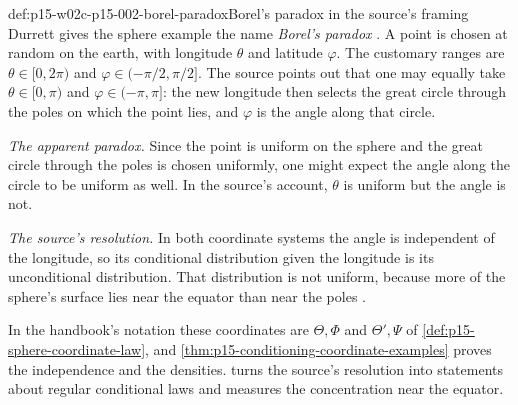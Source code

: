 \begin{hbexample}{def:p15-w02c-p15-002-borel-paradox}{Borel's paradox in the source's framing}
Durrett gives the sphere example the name \emph{Borel's paradox}
\cite[Example~4.1.8, p.~210]{DurrettPTEAuthor2019}. A point is chosen at
random on the earth, with longitude \(\theta\) and latitude \(\varphi\).
The customary ranges are \(\theta\in[0,2\pi)\) and
\(\varphi\in(-\pi/2,\pi/2]\). The source points out that one may equally
take \(\theta\in[0,\pi)\) and \(\varphi\in(-\pi,\pi]\): the new longitude
then selects the great circle through the poles on which the point lies,
and \(\varphi\) is the angle along that circle.

\emph{The apparent paradox.} Since the point is uniform on the sphere and
the great circle through the poles is chosen uniformly, one might expect
the angle along the circle to be uniform as well. In the source's account,
\(\theta\) is uniform but the angle is not.

\emph{The source's resolution.} In both coordinate systems the angle is
independent of the longitude, so its conditional distribution given the
longitude is its unconditional distribution. That distribution is not
uniform, because more of the sphere's surface lies near the equator than
near the poles \cite[p.~210]{DurrettPTEAuthor2019}.

In the handbook's notation these coordinates are \(\Theta,\Phi\) and
\(\Theta',\Psi\) of \cref{def:p15-sphere-coordinate-law}, and
\cref{thm:p15-conditioning-coordinate-examples} proves the independence
and the densities.  turns the
source's resolution into statements about regular conditional laws and
measures the concentration near the equator.
\end{hbexample}

